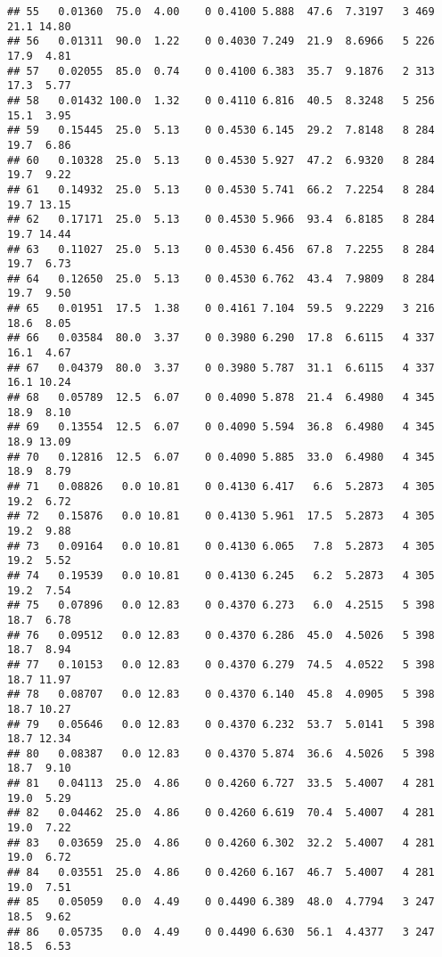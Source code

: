 \documentclass[
]{article}
\begin{document}
\begin{verbatim}
## 55   0.01360  75.0  4.00    0 0.4100 5.888  47.6  7.3197   3 469    21.1 14.80
## 56   0.01311  90.0  1.22    0 0.4030 7.249  21.9  8.6966   5 226    17.9  4.81
## 57   0.02055  85.0  0.74    0 0.4100 6.383  35.7  9.1876   2 313    17.3  5.77
## 58   0.01432 100.0  1.32    0 0.4110 6.816  40.5  8.3248   5 256    15.1  3.95
## 59   0.15445  25.0  5.13    0 0.4530 6.145  29.2  7.8148   8 284    19.7  6.86
## 60   0.10328  25.0  5.13    0 0.4530 5.927  47.2  6.9320   8 284    19.7  9.22
## 61   0.14932  25.0  5.13    0 0.4530 5.741  66.2  7.2254   8 284    19.7 13.15
## 62   0.17171  25.0  5.13    0 0.4530 5.966  93.4  6.8185   8 284    19.7 14.44
## 63   0.11027  25.0  5.13    0 0.4530 6.456  67.8  7.2255   8 284    19.7  6.73
## 64   0.12650  25.0  5.13    0 0.4530 6.762  43.4  7.9809   8 284    19.7  9.50
## 65   0.01951  17.5  1.38    0 0.4161 7.104  59.5  9.2229   3 216    18.6  8.05
## 66   0.03584  80.0  3.37    0 0.3980 6.290  17.8  6.6115   4 337    16.1  4.67
## 67   0.04379  80.0  3.37    0 0.3980 5.787  31.1  6.6115   4 337    16.1 10.24
## 68   0.05789  12.5  6.07    0 0.4090 5.878  21.4  6.4980   4 345    18.9  8.10
## 69   0.13554  12.5  6.07    0 0.4090 5.594  36.8  6.4980   4 345    18.9 13.09
## 70   0.12816  12.5  6.07    0 0.4090 5.885  33.0  6.4980   4 345    18.9  8.79
## 71   0.08826   0.0 10.81    0 0.4130 6.417   6.6  5.2873   4 305    19.2  6.72
## 72   0.15876   0.0 10.81    0 0.4130 5.961  17.5  5.2873   4 305    19.2  9.88
## 73   0.09164   0.0 10.81    0 0.4130 6.065   7.8  5.2873   4 305    19.2  5.52
## 74   0.19539   0.0 10.81    0 0.4130 6.245   6.2  5.2873   4 305    19.2  7.54
## 75   0.07896   0.0 12.83    0 0.4370 6.273   6.0  4.2515   5 398    18.7  6.78
## 76   0.09512   0.0 12.83    0 0.4370 6.286  45.0  4.5026   5 398    18.7  8.94
## 77   0.10153   0.0 12.83    0 0.4370 6.279  74.5  4.0522   5 398    18.7 11.97
## 78   0.08707   0.0 12.83    0 0.4370 6.140  45.8  4.0905   5 398    18.7 10.27
## 79   0.05646   0.0 12.83    0 0.4370 6.232  53.7  5.0141   5 398    18.7 12.34
## 80   0.08387   0.0 12.83    0 0.4370 5.874  36.6  4.5026   5 398    18.7  9.10
## 81   0.04113  25.0  4.86    0 0.4260 6.727  33.5  5.4007   4 281    19.0  5.29
## 82   0.04462  25.0  4.86    0 0.4260 6.619  70.4  5.4007   4 281    19.0  7.22
## 83   0.03659  25.0  4.86    0 0.4260 6.302  32.2  5.4007   4 281    19.0  6.72
## 84   0.03551  25.0  4.86    0 0.4260 6.167  46.7  5.4007   4 281    19.0  7.51
## 85   0.05059   0.0  4.49    0 0.4490 6.389  48.0  4.7794   3 247    18.5  9.62
## 86   0.05735   0.0  4.49    0 0.4490 6.630  56.1  4.4377   3 247    18.5  6.53

\end{verbatim}
\end{document}
